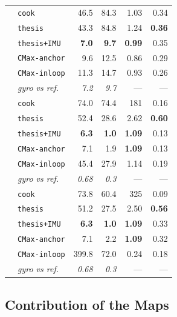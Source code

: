\documentclass[journal]{IEEEtran}
\begin{document}
\begin{table}[!t]
\begin{tabular}{@{}llrrrr@{}}
  & \texttt{cook} & 46.5 & 84.3 & 1.03 & 0.34 \\
  & \texttt{thesis} & 43.3 & 84.8 & 1.24 & \textbf{0.36} \\
  & \texttt{thesis+IMU} & \textbf{7.0} & \textbf{9.7} & \textbf{0.99} & 0.35 \\
  & \texttt{CMax-anchor} & 9.6 & 12.5 & 0.86 & 0.29 \\
  & \texttt{CMax-inloop} & 11.3 & 14.7 & 0.93 & 0.26 \\
 & \emph{gyro vs ref.}   & \emph{7.2} & \emph{9.7} & --- & --- \\
\midrule
{}
  & \texttt{cook} & 74.0 & 74.4 & 181 & 0.16 \\
  & \texttt{thesis} & 52.4 & 28.6 & 2.62 & \textbf{0.60} \\
  & \texttt{thesis+IMU} & \textbf{6.3} & \textbf{1.0} & \textbf{1.09} & 0.13 \\
  & \texttt{CMax-anchor} & 7.1 & 1.9 & \textbf{1.09} & 0.13 \\
  & \texttt{CMax-inloop} & 45.4 & 27.9 & 1.14 & 0.19 \\
 & \emph{gyro vs ref.}   & \emph{0.68} & \emph{0.3} & --- & --- \\
\midrule
{}
  & \texttt{cook} & 73.8 & 60.4 & 325 & 0.09 \\
  & \texttt{thesis} & 51.2 & 27.5 & 2.50 & \textbf{0.56} \\
  & \texttt{thesis+IMU} & \textbf{6.3} & \textbf{1.0} & \textbf{1.09} & 0.33 \\
  & \texttt{CMax-anchor} & 7.1 & 2.2 & \textbf{1.09} & 0.32 \\
  & \texttt{CMax-inloop} & 399.8 & 72.0 & 0.24 & 0.18 \\
 & \emph{gyro vs ref.}   & \emph{0.68} & \emph{0.3} & --- & --- \\
\bottomrule
\end{tabular}
\end{table}

\subsection{Contribution of the Maps}
\label{sec:maps_add}
\label{sec:baseline}
\label{sec:speed}
\end{document}
